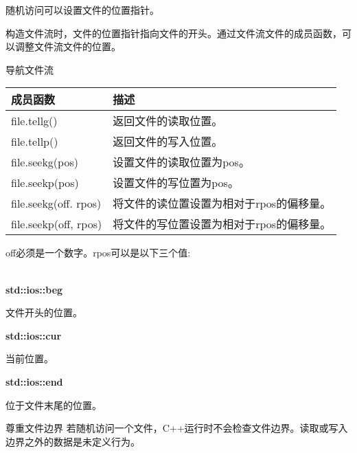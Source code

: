 
随机访问可以设置文件的位置指针。

构造文件流时，文件的位置指针指向文件的开头。通过文件流文件的成员函数，可以调整文件流文件的位置。

\begin{center}
导航文件流
\end{center}

\begin{longtable}[c]{|l|l|}
\hline
\textbf{成员函数} & \textbf{描述}                    \\ \hline
\endfirsthead
%
\endhead
%
file.tellg()             & 返回文件的读取位置。      \\ \hline
file.tellp()             & 返回文件的写入位置。     \\ \hline
file.seekg(pos)          & 设置文件的读取位置为pos。  \\ \hline
file.seekp(pos)          & 设置文件的写位置为pos。 \\ \hline
file.seekg(off. rpos) & 将文件的读位置设置为相对于rpos的偏移量。  \\ \hline
file.seekp(off, rpos) & 将文件的写位置设置为相对于rpos的偏移量。 \\ \hline
\end{longtable}

off必须是一个数字。rpos可以是以下三个值:

\noindent
\\\textbf{std::ios::beg}

文件开头的位置。

\noindent
\textbf{std::ios::cur}

当前位置。

\noindent
\textbf{std::ios::end}

位于文件末尾的位置。

\begin{myWarning}{尊重文件边界}
若随机访问一个文件，C++运行时不会检查文件边界。读取或写入边界之外的数据是未定义行为。
\end{myWarning}


